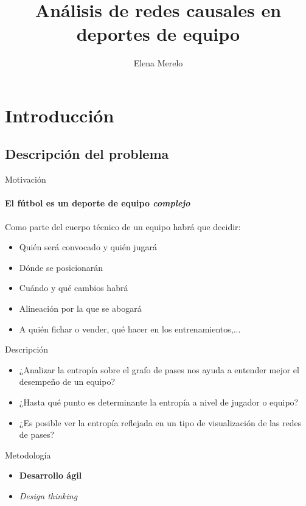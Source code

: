 \documentclass{beamer}
\title[Análisis de redes causales en deportes de equipo]{Análisis de redes causales en deportes de equipo}
\author[E. Merelo]{Elena Merelo}
\begin{document}
	\typesetFrontSlides


\section{Introducción}

\subsection[Problema]{Descripción del problema}

\begin{frame}{Motivación}
	\framesubtitle{El fútbol es un deporte de equipo \textit{complejo}}
    Como parte del cuerpo técnico de un equipo habrá que decidir:
    \begin{itemize}
		\item Quién será convocado y quién jugará
		\pause
		\item Dónde se posicionarán
		\pause
        \item Cuándo y qué cambios habrá
		\pause
        \item Alineación por la que se abogará
        \pause
        \item A quién fichar o vender, qué hacer en los entrenamientos,... 
	\end{itemize}
\end{frame}

\begin{frame}{Descripción}
	\begin{itemize}
		\item <1->¿Analizar la entropía sobre el grafo de pases nos ayuda a entender mejor el desempeño de un equipo?
		\item <2->¿Hasta qué punto es determinante la entropía a nivel de jugador o equipo?
        \item <3->¿Es posible ver la entropía reflejada en un tipo de visualización de las redes de pases?
	\end{itemize}
\end{frame}

\begin{frame}{Metodología}
	\begin{itemize}
		\item \textbf{Desarrollo ágil}
		\pause
		\item \textit{Design thinking}
	\end{itemize}
\end{frame}
\end{document}
